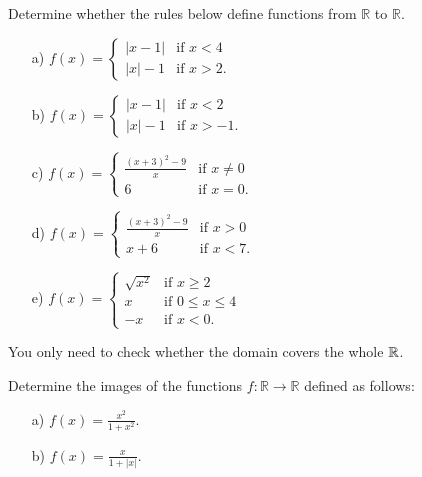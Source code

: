 \begin{exercise}
	Determine whether the rules below define functions from $\mathbb{R}$ to $\mathbb{R}$.
	\begin{enumerate}
		\item[a)] \( f(x) = 
		\begin{cases} 
		|x - 1| & \text{if } x < 4 \\
		|x| - 1 & \text{if } x > 2.
		\end{cases} \)
		
		\item[b)] \( f(x) = 
		\begin{cases} 
		|x - 1| & \text{if } x < 2 \\
		|x| - 1 & \text{if } x > -1.
		\end{cases} \)
		
		\item[c)] \( f(x) = 
		\begin{cases} 
		\frac{(x + 3)^2 - 9}{x} & \text{if } x \neq 0 \\
		6 & \text{if } x = 0.
		\end{cases} \)
		
		\item[d)] \( f(x) = 
		\begin{cases} 
		\frac{(x + 3)^2 - 9}{x} & \text{if } x > 0 \\
		x + 6 & \text{if } x < 7.
		\end{cases} \)
		
		\item[e)] \( f(x) = 
		\begin{cases} 
		\sqrt{x^2} & \text{if } x \geq 2 \\
		x & \text{if } 0 \leq x \leq 4 \\
		-x & \text{if } x < 0.
		\end{cases} \)
	\end{enumerate}
\end{exercise}
\begin{remark}
	You only need to check whether the domain covers the whole $\mathbb{R}$.
\end{remark}
\begin{exercise}
    Determine the images of the functions \( f: \mathbb{R} \rightarrow \mathbb{R} \) defined as follows:
    \begin{enumerate}
        \item[a)] \( f(x) = \frac{x^2}{1 + x^2} \).
        \item[b)] \( f(x) = \frac{x}{1 + |x|} \).
    \end{enumerate}
\end{exercise}
